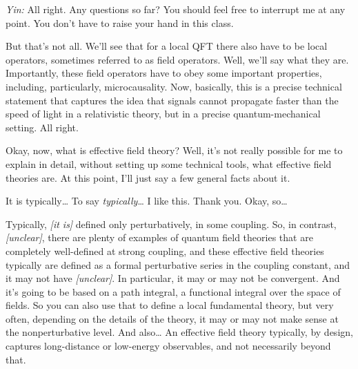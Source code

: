 \textit{Yin:} All right. Any questions so far? You should feel free to
interrupt me at any point. You don't have to raise your hand in this class.

But that's not all. We'll see that for a local QFT there also have to be local
operators, sometimes referred to as field operators. Well, we'll say what they
are. Importantly, these field operators have to obey some important
properties, including, particularly, microcausality. Now, basically, this is a
precise technical statement that captures the idea that signals cannot
propagate faster than the speed of light in a relativistic theory, but in a
precise quantum-mechanical setting. All right.


Okay, now, what is effective field theory? Well, it's not really possible for
me to explain in detail, without setting up some technical tools, what
effective field theories are. At this point, I'll just say a few general facts
about it.

It is typically\ldots{} To say \emph{typically}\ldots{} I like this. Thank
you. Okay, so\ldots{}

Typically, \emph{[it is]} defined only perturbatively, in some coupling. So, in
contrast, \emph{[unclear]}, there are plenty of examples of quantum field
theories that are completely well-defined at strong coupling, and these
effective field theories typically are defined as a formal perturbative series
in the coupling constant, and it may not have \emph{[unclear]}. In particular,
it may or may not be convergent. And it's going to be based on a path integral,
a functional integral over the space of fields. So you can also use that to
define a local fundamental theory, but very often, depending on the details of
the theory, it may or may not make sense at the nonperturbative level. And
also\ldots{} An effective field theory typically, by design, captures
long-distance or low-energy observables, and not necessarily beyond that.

